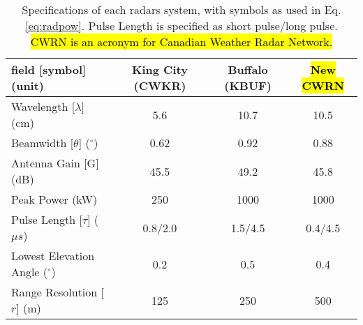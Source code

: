 \begin{table}[h]
    \caption{Specifications of each radars system, with symbols as used in Eq. \ref{eq:radpow}. Pulse Length is specified as short pulse/long pulse. \hl{CWRN is an acronym for Canadian Weather Radar Network.}}\label{radarspecs}
    \begin{center}
    \begin{tabular}{|l|c|c|c|}
    \hline
     field [symbol](unit) & King City (CWKR) & Buffalo (KBUF) & \hl{New CWRN} \\
    \hline\hline
    Wavelength [$\lambda$](cm) & 5.6  & 10.7 & 10.5\\
    \hline
    Beamwidth [$\theta$] ($^\circ$)  & 0.62  & 0.92 & 0.88 \\
    \hline
     Antenna Gain [G] (dB) & 45.5 & 49.2 & 45.8\\
    \hline
     Peak Power (kW) & 250 & 1000 & 1000 \\
    \hline
     Pulse Length [$\tau$] ($\mu s$) &  0.8/2.0 & 1.5/4.5 & 0.4/4.5 \\
    \hline
     Lowest Elevation Angle ($^\circ$) & 0.2 & 0.5 & 0.4 \\
    \hline
     Range Resolution [$r$] (m)& 125 & 250 & 500 \\
    \hline
    \end{tabular}
    \end{center}
\end{table}


